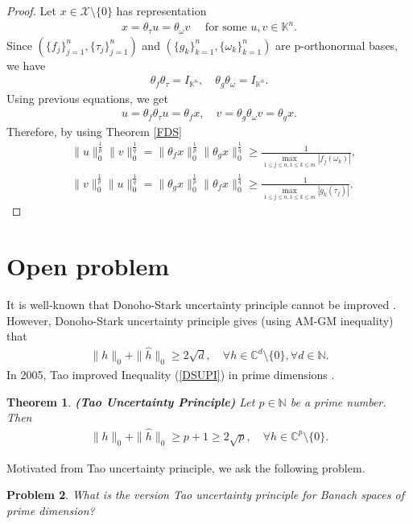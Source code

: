 \documentclass{amsart}
\newtheorem{theorem}{Theorem}[section]
\newtheorem{problem}[theorem]{Problem}
\begin{document}
\begin{proof}
	Let $x \in \mathcal{X}\setminus\{0\}$ has representation 
	\begin{align*}
		x=\theta_\tau u=\theta_\omega v \quad \text{ for some } u, v \in \mathbb{K}^n.
	\end{align*}
	Since $(\{f_j\}_{j=1}^n, \{\tau_j\}_{j=1}^n)$ and   $(\{g_k\}_{k=1}^n, \{\omega_k\}_{k=1}^n)$ are p-orthonormal bases, we have 
	\begin{align*}
		\theta_f \theta_\tau =I_{\mathbb{K}^n}, \quad 	\theta_g \theta_\omega =I_{\mathbb{K}^n}.
	\end{align*}
 Using previous equations, we get 
 \begin{align*}
 	u=	\theta_f \theta_\tau u=\theta_f x, \quad v=	\theta_g \theta_\omega v=\theta_g x.
 \end{align*}
Therefore, by using Theorem \ref{FDS}
\begin{align*}
	&\|u\|_0^\frac{1}{p}\|v\|_0^\frac{1}{q} =	\|\theta_f x \|_0^\frac{1}{p}\|\theta_g x\|_0^\frac{1}{q}\geq 	\frac{1}{\displaystyle\max_{1\leq j\leq n, 1\leq k\leq m}|f_j(\omega_k)|},\\
	& \|v\|_0^\frac{1}{p}\|u\|_0^\frac{1}{q}=\|\theta_g x\|_0^\frac{1}{p}\|\theta_ f x\|_0^\frac{1}{q}\geq \frac{1}{\displaystyle\max_{1\leq j\leq n, 1\leq k\leq m}|g_k(\tau_j)|}.
\end{align*}
\end{proof}

\section{Open problem}
It is well-known  that Donoho-Stark uncertainty principle cannot be improved \cite{DONOHOSTARK}. However,  Donoho-Stark uncertainty principle gives (using AM-GM inequality) that 
\begin{align}\label{DSUPI}
	 \|h\|_0+\|\widehat{h}\|_0	\geq 2 \sqrt{d} , \quad \forall h \in \mathbb{C}^d\setminus \{0\}, \forall d \in \mathbb{N}.
\end{align}
In 2005, Tao improved Inequality (\ref{DSUPI}) in prime dimensions \cite{TAO}. 
\begin{theorem} \textbf{(Tao Uncertainty Principle)} \cite{TAO} 
Let $p \in \mathbb{N}$ be a prime number. Then 	
\begin{align*}
	 \|h\|_0+\|\widehat{h}\|_0	\geq p+1\geq 2 \sqrt{p}, \quad \forall h \in \mathbb{C}^p\setminus \{0\}.
\end{align*}
\end{theorem}
Motivated from Tao uncertainty principle, we ask the following problem.
\begin{problem}
	What is the version  Tao uncertainty principle for Banach spaces of prime dimension?
\end{problem}


















 
 
 
\end{document}

